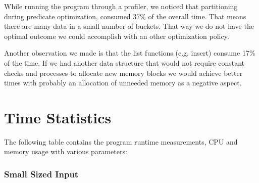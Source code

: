 \documentclass{ws-ijprai}
\begin{document}
\tab While running the program through a profiler, we noticed that partitioning during predicate optimization, consumed 37\% of the overall time. That means there are many data in a small number of buckets. That way we do not have the optimal outcome we could accomplish with an other optimization policy.

\tab Another observation we made is that the list functions (e.g. insert) consume 17\% of the time. If we had another data structure that would not require constant checks and processes to allocate new memory blocks we would achieve better times with probably an allocation of unneeded memory as a negative aspect.

\section{Time Statistics}

\tab The following table contains the program runtime measurements, CPU and memory usage with various parameters:\\

\subsubsection{Small Sized Input}
\end{document}
